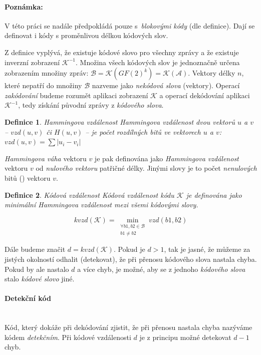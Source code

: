 \documentclass[thesis=M,czech,hidelinks]{FITthesis}[2012/06/26]
\newcommand{\0}{{\textcolor[gray]{0.80}{0}}}
\newtheorem{definice}{Definice}
\begin{document}
\paragraph{Poznámka:} V této práci se nadále předpokládá pouze s~\emph{blokovými
kódy} (dle definice).  Dají se definovat i kódy s proměnlivou délkou kódových
slov.

Z definice vyplývá, že existuje kódové slovo pro všechny zprávy a že existuje
inverzní zobrazení $\mathcal{K}^{-1}$. Množina všech kódových slov je
jednoznačně určena zobrazením množiny zpráv:
$\mathcal{B}=\mathcal{K}(GF(2)^k)=\mathcal{K}(\mathcal{A})$. Vektory délky $n$,
které nepatří do množiny $\mathcal{B}$ nazveme jako \emph{nekódová slova}
(vektory). Operací \emph{zakódování} budeme rozumět aplikaci zobrazení
$\mathcal{K}$ a operací dekódování aplikaci $\mathcal{K}^{-1}$, tedy získání
původní zprávy z \emph{kódového slova}.

\begin{definice}{Hammingova vzdálenost}
    \emph{Hammingova vzdálenost} dvou vektorů $u$ a $v$ -- $vzd(u,v)$ či
    $H(u,v)$ -- je počet rozdílných \emph{bitů} ve vektorech $u$ a $v$:
    $vzd(u,v) = \sum \left| u_i - v_i \right|$
\end{definice}

\emph{Hammingova váha} vektoru $v$ je pak definována jako \emph{Hammingova
vzdálenost} vektoru $v$ od \emph{nulového vektoru} patřičné délky. Jinými slovy
je to počet \emph{nenulových} bitů () vektoru $v$.


\begin{definice}{Kódová vzdálenost}
    Kódová vzdálenost kódu $\mathcal{K}$ je definována jako minimální
    \emph{Hammingova vzdálenost} mezi všemi kódovými slovy.

    $$
        kvzd(\mathcal{K}) =
        \min_{\substack{\forall b1,b2 \in \mathcal{B} \\ b1 \neq b2}} vzd(b1,b2)
    $$
\end{definice}

Dále budeme značit $d = kvzd(\mathcal{K})$. Pokud je $d > 1$, tak je jasné, že
můžeme za jistých okolností odhalit (detekovat), že při přenosu kódového slova
nastala chyba. Pokud by ale nastalo $d$ a více chyb, je možné, aby se z jednoho
\emph{kódového slova} stalo \emph{kódové slovo} jiné.

\paragraph{Detekční kód} \hfil \\
Kód, který dokáže při dekódování zjistit, že při přenosu nastala chyba nazýváme
kódem \emph{detekčním}. Při kódové vzdálenosti $d$ je z principu možné detekovat
$d-1$ chyb.
\end{document}
